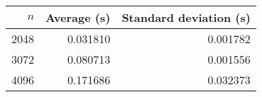 \begin{tabular}{rrr}
$n$ & Average (s) & Standard deviation (s)\\\hline
2048 & 0.031810 & 0.001782\\
3072 & 0.080713 & 0.001556\\
4096 & 0.171686 & 0.032373\\
\end{tabular}
